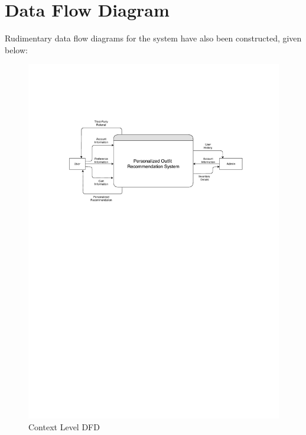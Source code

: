 \section{Data Flow Diagram}
Rudimentary data flow diagrams for the system have also been constructed, given below:

\begin{figure}[ht]
\includegraphics[width=15cm]{images/dfdContext.pdf} 
\centering
\caption{Context Level DFD}
\end{figure}


